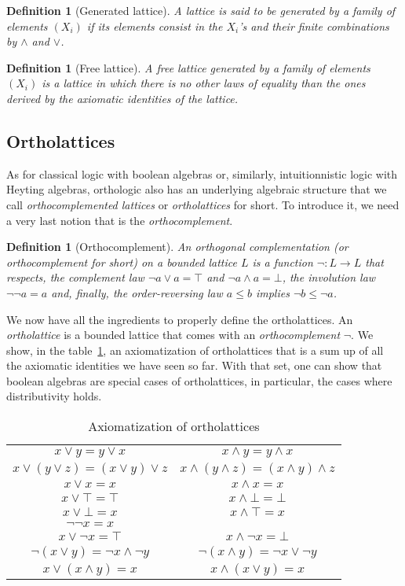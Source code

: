 \documentclass[a4paper, 11pt]{article}
\newtheorem{definition}[theorem]{Definition}
\begin{document}
    \begin{definition}[Generated lattice]
	    A lattice is said to be generated by a family of elements $(X_i)$ if its elements consist in
	    the $X_i$'s and their finite combinations by $\wedge$ and $\vee$.
    \end{definition}
    \begin{definition}[Free lattice]
	    A free lattice generated by a family of elements $(X_i)$ is a lattice in which there is no
	    other laws of equality than the ones derived by the axiomatic identities of the lattice.
    \end{definition}
    \subsection{Ortholattices}
    As for classical logic with boolean algebras or, similarly, intuitionnistic logic with Heyting 
    algebras, orthologic also has an underlying algebraic structure that we call 
    \textit{orthocomplemented lattices} or \textit{ortholattices} for short. To introduce it, we need
    a very last notion that is the \textit{orthocomplement}.
    \begin{definition}[Orthocomplement]
	    An orthogonal complementation (or orthocomplement for short) on a bounded lattice $L$ is a
	    function $\neg:L\rightarrow L$ that respects, the complement law $\neg a\vee a=\top$ and
	    $\neg a\wedge a=\bot$, the involution law $\neg\neg a=a$ and, finally, the order-reversing
	    law $a\leq b$ implies $\neg b\leq\neg a$.
    \end{definition}
    We now have all the ingredients to properly define the ortholattices. An \textit{ortholattice} is a 
    bounded
    lattice that comes with an \textit{orthocomplement} $\neg$. We show, in the table~\ref{tab_ax},
    an axiomatization of ortholattices that is a sum up of all the axiomatic identities we have seen so
    far. With that set, one can show that boolean algebras are special cases of ortholattices, in 
    particular, the cases where distributivity holds.
    \begin{table}[h]
	    \caption{Axiomatization of ortholattices}
	    \label{tab_ax}
    \begin{center} 
	    \begin{tabular}{ c|c }
		    $x\vee y=y\vee x$&$x\wedge y=y\wedge x$\\
		    $x\vee(y\vee z)=(x\vee y)\vee z$&$x\wedge(y\wedge z)=(x\wedge y)\wedge z$\\
		    $x\vee x=x$&$x\wedge x=x$\\
		    $x\vee\top=\top$&$x\wedge\bot=\bot$\\
		    $x\vee\bot=x$&$x\wedge\top=x$\\
		    $\neg\neg x=x$& \\
		    $x\vee\neg x=\top$&$x\wedge\neg x=\bot$\\
		    $\neg(x\vee y)=\neg x\wedge\neg y$&$\neg(x\wedge y)=\neg x\vee\neg y$\\
		    $x\vee(x\wedge y)=x$&$x\wedge(x\vee y)=x$
	    \end{tabular}
    \end{center}
    \end{table}
\end{document}
